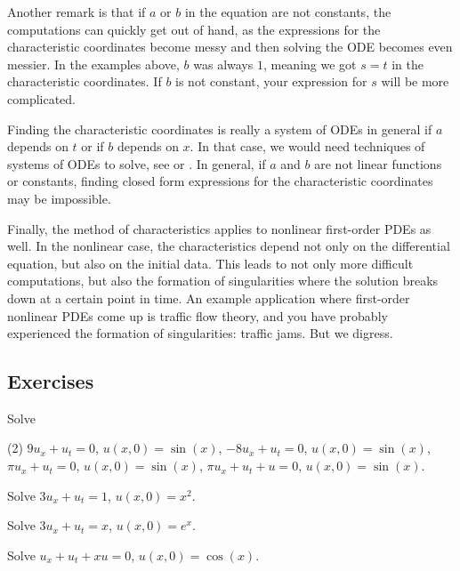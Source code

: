 Another remark is that if $a$ or $b$ in the equation are not constants,
the computations can
quickly get out of hand, as the expressions for the characteristic
coordinates become messy and then solving the ODE becomes even messier.
In the examples above, $b$ was always $1$, meaning we got $s=t$ in the 
characteristic coordinates.  If $b$ is not constant, your expression for $s$
will be more complicated.

Finding the characteristic coordinates is really
a system of ODEs in general if $a$ depends on $t$ or if $b$ depends on $x$.
In that case, we would need techniques of systems of ODEs
to solve, see  or .  In
general, if $a$ and $b$ are not linear functions or constants, finding closed
form expressions for the characteristic coordinates may be impossible.

Finally, the method of characteristics applies to nonlinear
first-order PDEs
as well.  In the nonlinear case, the characteristics depend not only
on the differential equation, but also on the initial data.  This leads to
not only more difficult computations, but also the formation of
singularities where the solution breaks down at a certain point in time.
An example application where first-order nonlinear PDEs come
up is traffic flow theory, and you have probably experienced the
formation of singularities: traffic jams.  But we digress.

\subsection{Exercises}

\begin{exercise}
Solve
\begin{tasks}(2)
\task $9u_x + u_t = 0$, \enspace $u(x,0) = \sin(x)$,
\task $-8u_x + u_t = 0$, \enspace $u(x,0) = \sin(x)$,
\task $\pi u_x + u_t = 0$, \enspace $u(x,0) = \sin(x)$,
\task $\pi u_x + u_t + u = 0$, \enspace $u(x,0) = \sin(x)$.
\end{tasks}
\end{exercise}

\begin{exercise}
Solve $3u_x + u_t = 1$, $u(x,0) = x^2$.
\end{exercise}

\begin{exercise}
Solve $3u_x + u_t = x$, $u(x,0) = e^x$.
\end{exercise}

\begin{exercise}
Solve $u_x+u_t+xu = 0$, $u(x,0) = \cos(x)$.
\end{exercise}


